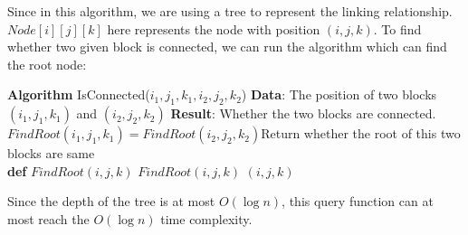 \documentclass[11pt]{article}
\begin{document}
Since in this algorithm, we are using a tree to represent the linking relationship. $Node[i][j][k]$ here represents the node with position $(i,j,k)$. To find whether two given block is connected, we can run the algorithm which can find the root node:
\begin{algorithmic}
	\State \textbf{Algorithm} IsConnected($i_1,j_1,k_1,i_2,j_2,k_2$)
	\State \textbf{Data}: The position of two blocks $(i_1,j_1,k_1)$ and $(i_2,j_2,k_2)$
	\State \textbf{Result}: Whether the two blocks are connected.
	\State \Return $FindRoot(i_1,j_1,k_1)=FindRoot(i_2,j_2,k_2)$\Comment Return whether the root of this two blocks are same
\\
	\State \textbf{def} $FindRoot(i,j,k)$
		\State \Return $FindRoot(i,j,k)$
	\Else
		\State \Return $(i,j,k)$
	\EndIf
\end{algorithmic}

Since the depth of the tree is at most $O(\log n)$, this query function can at most reach the $O(\log n)$ time complexity.
\end{document}
